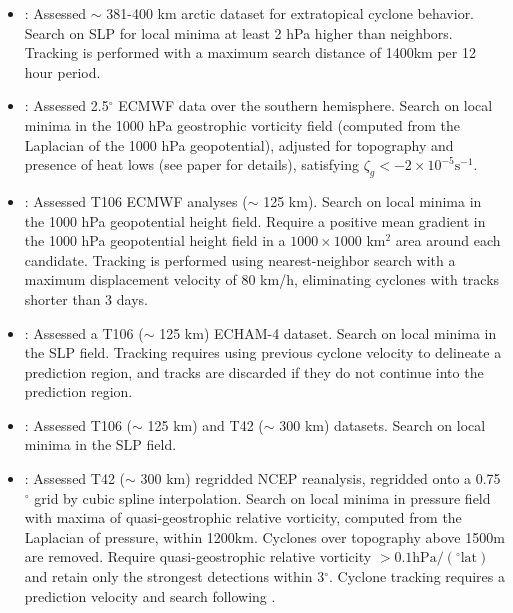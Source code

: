 \documentclass[gmdd, hvmath, online]{copernicus_discussions}
\begin{document}
\begin{itemize}
\item \cite{serreze1993characteristics, serreze1995climatological}:  Assessed $\sim$ 381-400 km arctic dataset for extratopical cyclone behavior.  Search on SLP for local minima at least 2 hPa higher than neighbors.  Tracking is performed with a maximum search distance of 1400km per 12 hour period.

\item \cite{sinclair1994objective, sinclair1997objective}:  Assessed 2.5$^\circ$ ECMWF data over the southern hemisphere.  Search on local minima in the 1000 hPa geostrophic vorticity field (computed from the Laplacian of the 1000 hPa geopotential), adjusted for topography and presence of heat lows (see paper for details), satisfying $\zeta_g < -2 \times 10^{-5} \mbox{s}^{-1}$.

\item \cite{blender1997identification}:  Assessed T106 ECMWF analyses ($\sim$ 125 km).  Search on local minima in the 1000 hPa geopotential height field.  Require a positive mean gradient in the 1000 hPa geopotential height field in a $1000 \times 1000$ km$^2$ area around each candidate.  Tracking is performed using nearest-neighbor search with a maximum displacement velocity of 80 km/h, eliminating cyclones with tracks shorter than 3 days.

\item \cite{lionello2002cyclones}:  Assessed a T106 ($\sim$ 125 km) ECHAM-4 dataset.  Search on local minima in the SLP field.  Tracking requires using previous cyclone velocity to delineate a prediction region, and tracks are discarded if they do not continue into the prediction region.

\item \cite{zolina2002improving}:  Assessed T106 ($\sim$ 125 km) and T42 ($\sim$ 300 km) datasets.  Search on local minima in the SLP field.

\item \cite{pinto2005sensitivities}:  Assessed T42 ($\sim$ 300 km) regridded NCEP reanalysis, regridded onto a 0.75$^\circ$ grid by cubic spline interpolation.  Search on local minima in pressure field with maxima of quasi-geostrophic relative vorticity, computed from the Laplacian of pressure, within 1200km.  Cyclones over topography above 1500m are removed.  Require quasi-geostrophic relative vorticity $> 0.1 \mbox{hPa} / (^\circ \mbox{lat})$ and retain only the strongest detections within 3$^\circ$.  Cyclone tracking requires a prediction velocity and search following \cite{murray1991numerical}.


\end{itemize}
\end{document}
